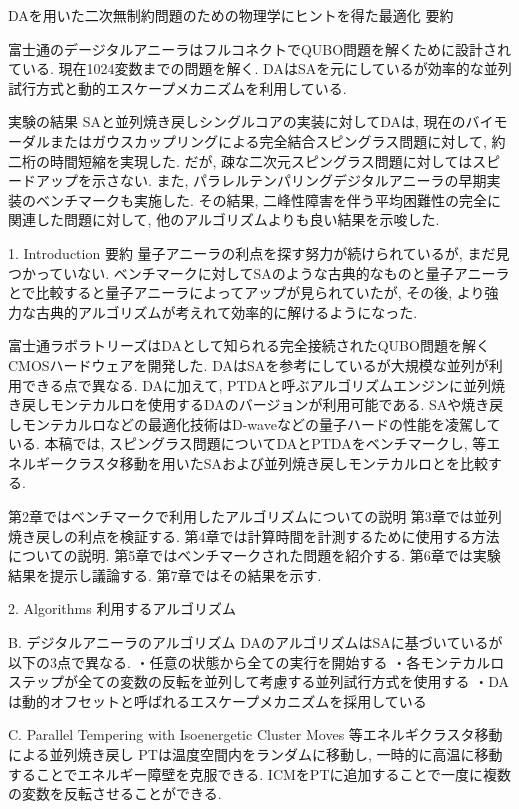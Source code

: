 DAを用いた二次無制約問題のための物理学にヒントを得た最適化
要約

富士通のデージタルアニーラはフルコネクトでQUBO問題を解くために設計されている.
現在1024変数までの問題を解く. 
DAはSAを元にしているが効率的な並列試行方式と動的エスケープメカニズムを利用している. 

実験の結果
SAと並列焼き戻しシングルコアの実装に対してDAは, 現在のバイモーダルまたはガウスカップリングによる完全結合スピングラス問題に対して, 約二桁の時間短縮を実現した. 
だが, 疎な二次元スピングラス問題に対してはスピードアップを示さない. 
また, パラレルテンパリングデジタルアニーラの早期実装のベンチマークも実施した. 
その結果, 二峰性障害を伴う平均困難性の完全に関連した問題に対して, 他のアルゴリズムよりも良い結果を示唆した. 

1. Introduction 要約
量子アニーラの利点を探す努力が続けられているが, まだ見つかっていない. 
ベンチマークに対してSAのような古典的なものと量子アニーラとで比較すると量子アニーラによってアップが見られていたが, その後, より強力な古典的アルゴリズムが考えれて効率的に解けるようになった.

富士通ラボラトリーズはDAとして知られる完全接続されたQUBO問題を解くCMOSハードウェアを開発した. 
DAはSAを参考にしているが大規模な並列が利用できる点で異なる. 
DAに加えて, PTDAと呼ぶアルゴリズムエンジンに並列焼き戻しモンテカルロを使用するDAのバージョンが利用可能である. 
SAや焼き戻しモンテカルロなどの最適化技術はD-waveなどの量子ハードの性能を凌駕している. 
本稿では, スピングラス問題についてDAとPTDAをベンチマークし, 等エネルギークラスタ移動を用いたSAおよび並列焼き戻しモンテカルロとを比較する. 

第2章ではベンチマークで利用したアルゴリズムについての説明
第3章では並列焼き戻しの利点を検証する. 
第4章では計算時間を計測するために使用する方法についての説明. 
第5章ではベンチマークされた問題を紹介する. 
第6章では実験結果を提示し議論する. 
第7章ではその結果を示す. 

2. Algorithms 利用するアルゴリズム

B. デジタルアニーラのアルゴリズム
DAのアルゴリズムはSAに基づいているが以下の3点で異なる. 
・任意の状態から全ての実行を開始する
・各モンテカルロステップが全ての変数の反転を並列して考慮する並列試行方式を使用する
・DAは動的オフセットと呼ばれるエスケープメカニズムを採用している

C. Parallel Tempering with Isoenergetic Cluster Moves 等エネルギクラスタ移動による並列焼き戻し
PTは温度空間内をランダムに移動し, 一時的に高温に移動することでエネルギー障壁を克服できる. 
ICMをPTに追加することで一度に複数の変数を反転させることができる. 

